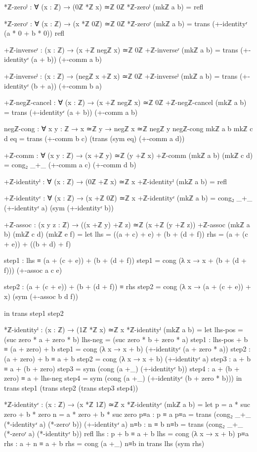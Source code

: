 \documentclass[11pt,a4paper]{book}
\begin{document}
\begin{code}
*ℤ-zeroˡ : ∀ (x : ℤ) → (0ℤ *ℤ x) ≃ℤ 0ℤ
*ℤ-zeroˡ (mkℤ a b) = refl

*ℤ-zeroʳ : ∀ (x : ℤ) → (x *ℤ 0ℤ) ≃ℤ 0ℤ
*ℤ-zeroʳ (mkℤ a b) = 
  trans (+-identityʳ (a * 0 + b * 0)) refl

+ℤ-inverseʳ : (x : ℤ) → (x +ℤ negℤ x) ≃ℤ 0ℤ
+ℤ-inverseʳ (mkℤ a b) = trans (+-identityʳ (a + b)) (+-comm a b)

+ℤ-inverseˡ : (x : ℤ) → (negℤ x +ℤ x) ≃ℤ 0ℤ
+ℤ-inverseˡ (mkℤ a b) = trans (+-identityʳ (b + a)) (+-comm b a)

+ℤ-negℤ-cancel : ∀ (x : ℤ) → (x +ℤ negℤ x) ≃ℤ 0ℤ
+ℤ-negℤ-cancel (mkℤ a b) = trans (+-identityʳ (a + b)) (+-comm a b)

negℤ-cong : ∀ {x y : ℤ} → x ≃ℤ y → negℤ x ≃ℤ negℤ y
negℤ-cong {mkℤ a b} {mkℤ c d} eq = 
  trans (+-comm b c) (trans (sym eq) (+-comm a d))

+ℤ-comm : ∀ (x y : ℤ) → (x +ℤ y) ≃ℤ (y +ℤ x)
+ℤ-comm (mkℤ a b) (mkℤ c d) = 
  cong₂ _+_ (+-comm a c) (+-comm d b)

+ℤ-identityˡ : ∀ (x : ℤ) → (0ℤ +ℤ x) ≃ℤ x
+ℤ-identityˡ (mkℤ a b) = refl

+ℤ-identityʳ : ∀ (x : ℤ) → (x +ℤ 0ℤ) ≃ℤ x
+ℤ-identityʳ (mkℤ a b) = cong₂ _+_ (+-identityʳ a) (sym (+-identityʳ b))

+ℤ-assoc : (x y z : ℤ) → ((x +ℤ y) +ℤ z) ≃ℤ (x +ℤ (y +ℤ z))
+ℤ-assoc (mkℤ a b) (mkℤ c d) (mkℤ e f) = 
  let
    lhs = ((a + c) + e) + (b + (d + f))
    rhs = (a + (c + e)) + ((b + d) + f)
    
    step1 : lhs ≡ (a + (c + e)) + (b + (d + f))
    step1 = cong (λ x → x + (b + (d + f))) (+-assoc a c e)
    
    step2 : (a + (c + e)) + (b + (d + f)) ≡ rhs
    step2 = cong (λ x → (a + (c + e)) + x) (sym (+-assoc b d f))
    
  in trans step1 step2

*ℤ-identityˡ : (x : ℤ) → (1ℤ *ℤ x) ≃ℤ x
*ℤ-identityˡ (mkℤ a b) = 
  let lhs-pos = (suc zero * a + zero * b)
      lhs-neg = (suc zero * b + zero * a)
      step1 : lhs-pos + b ≡ (a + zero) + b
      step1 = cong (λ x → x + b) (+-identityʳ (a + zero * a))
      step2 : (a + zero) + b ≡ a + b
      step2 = cong (λ x → x + b) (+-identityʳ a)
      step3 : a + b ≡ a + (b + zero)
      step3 = sym (cong (a +_) (+-identityʳ b))
      step4 : a + (b + zero) ≡ a + lhs-neg
      step4 = sym (cong (a +_) (+-identityʳ (b + zero * b)))
  in trans step1 (trans step2 (trans step3 step4))

*ℤ-identityʳ : (x : ℤ) → (x *ℤ 1ℤ) ≃ℤ x
*ℤ-identityʳ (mkℤ a b) = 
  let p = a * suc zero + b * zero
      n = a * zero + b * suc zero
      p≡a : p ≡ a
      p≡a = trans (cong₂ _+_ (*-identityʳ a) (*-zeroʳ b)) (+-identityʳ a)
      n≡b : n ≡ b
      n≡b = trans (cong₂ _+_ (*-zeroʳ a) (*-identityʳ b)) refl
      lhs : p + b ≡ a + b
      lhs = cong (λ x → x + b) p≡a
      rhs : a + n ≡ a + b
      rhs = cong (a +_) n≡b
  in trans lhs (sym rhs)


\end{code}
\end{document}
